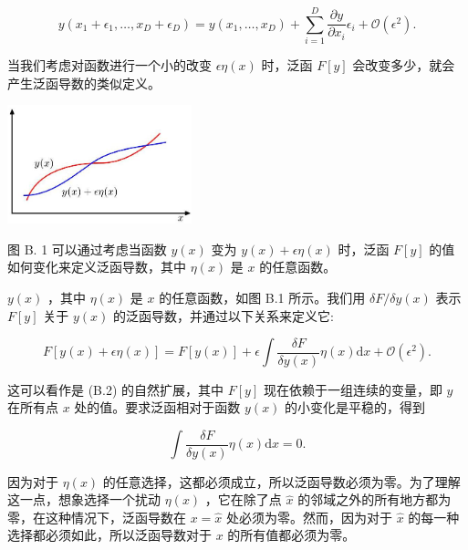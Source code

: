 \documentclass[10pt]{report}
\begin{document}
\[
y\left( {{x}_{1} + {\epsilon }_{1},\ldots ,{x}_{D} + {\epsilon }_{D}}\right)  = y\left( {{x}_{1},\ldots ,{x}_{D}}\right)  + \mathop{\sum }\limits_{{i = 1}}^{D}\frac{\partial y}{\partial {x}_{i}}{\epsilon }_{i} + \mathcal{O}\left( {\epsilon }^{2}\right) . \tag{B.2}
\]

当我们考虑对函数进行一个小的改变 \({\epsilon \eta }\left( x\right)\) 时，泛函 \(F\left\lbrack  y\right\rbrack\) 会改变多少，就会产生泛函导数的类似定义。

\begin{center}
\includegraphics[max width=0.4\textwidth]{images/0194e279-9b28-703a-88f4-c3ac21e2010d_637_1010_344_535_345_0.jpg}
\end{center}
\hspace*{3em} 

图 B. 1 可以通过考虑当函数 \(y\left( x\right)\) 变为 \(y\left( x\right)  + {\epsilon \eta }\left( x\right)\) 时，泛函 \(F\left\lbrack  y\right\rbrack\) 的值如何变化来定义泛函导数，其中 \(\eta \left( x\right)\) 是 \(x\) 的任意函数。

\(y\left( x\right)\) ，其中 \(\eta \left( x\right)\) 是 \(x\) 的任意函数，如图 B.1 所示。我们用 \({\delta F}/{\delta y}\left( x\right)\) 表示 \(F\left\lbrack  y\right\rbrack\) 关于 \(y\left( x\right)\) 的泛函导数，并通过以下关系来定义它:

\[
F\left\lbrack  {y\left( x\right)  + {\epsilon \eta }\left( x\right) }\right\rbrack   = F\left\lbrack  {y\left( x\right) }\right\rbrack   + \epsilon \int \frac{\delta F}{{\delta y}\left( x\right) }\eta \left( x\right) \mathrm{d}x + \mathcal{O}\left( {\epsilon }^{2}\right) . \tag{B.3}
\]

这可以看作是 (B.2) 的自然扩展，其中 \(F\left\lbrack  y\right\rbrack\) 现在依赖于一组连续的变量，即 \(y\) 在所有点 \(x\) 处的值。要求泛函相对于函数 \(y\left( x\right)\) 的小变化是平稳的，得到

\[
\int \frac{\delta F}{{\delta y}\left( x\right) }\eta \left( x\right) \mathrm{d}x = 0. \tag{B.4}
\]

因为对于 \(\eta \left( x\right)\) 的任意选择，这都必须成立，所以泛函导数必须为零。为了理解这一点，想象选择一个扰动 \(\eta \left( x\right)\) ，它在除了点 \(\widehat{x}\) 的邻域之外的所有地方都为零，在这种情况下，泛函导数在 \(x = \widehat{x}\) 处必须为零。然而，因为对于 \(\widehat{x}\) 的每一种选择都必须如此，所以泛函导数对于 \(x\) 的所有值都必须为零。
\end{document}
